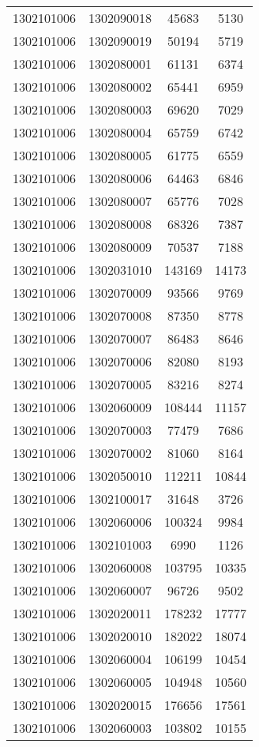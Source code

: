 \begin{longtable}{llcc}
1302101006 & 1302090018 & 45683 & 5130\\
1302101006 & 1302090019 & 50194 & 5719\\
1302101006 & 1302080001 & 61131 & 6374\\
1302101006 & 1302080002 & 65441 & 6959\\
1302101006 & 1302080003 & 69620 & 7029\\
1302101006 & 1302080004 & 65759 & 6742\\
1302101006 & 1302080005 & 61775 & 6559\\
1302101006 & 1302080006 & 64463 & 6846\\
1302101006 & 1302080007 & 65776 & 7028\\
1302101006 & 1302080008 & 68326 & 7387\\
1302101006 & 1302080009 & 70537 & 7188\\
1302101006 & 1302031010 & 143169 & 14173\\
1302101006 & 1302070009 & 93566 & 9769\\
1302101006 & 1302070008 & 87350 & 8778\\
1302101006 & 1302070007 & 86483 & 8646\\
1302101006 & 1302070006 & 82080 & 8193\\
1302101006 & 1302070005 & 83216 & 8274\\
1302101006 & 1302060009 & 108444 & 11157\\
1302101006 & 1302070003 & 77479 & 7686\\
1302101006 & 1302070002 & 81060 & 8164\\
1302101006 & 1302050010 & 112211 & 10844\\
1302101006 & 1302100017 & 31648 & 3726\\
1302101006 & 1302060006 & 100324 & 9984\\
1302101006 & 1302101003 & 6990 & 1126\\
1302101006 & 1302060008 & 103795 & 10335\\
1302101006 & 1302060007 & 96726 & 9502\\
1302101006 & 1302020011 & 178232 & 17777\\
1302101006 & 1302020010 & 182022 & 18074\\
1302101006 & 1302060004 & 106199 & 10454\\
1302101006 & 1302060005 & 104948 & 10560\\
1302101006 & 1302020015 & 176656 & 17561\\
1302101006 & 1302060003 & 103802 & 10155\\

\end{longtable}
